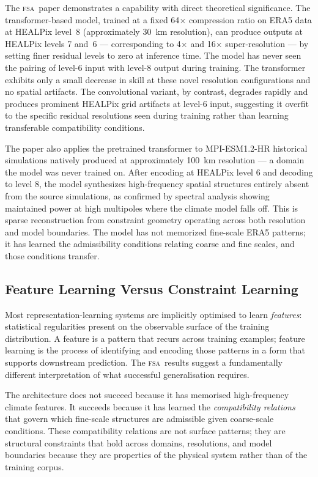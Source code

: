 \documentclass[11pt,a4paper]{article}
\theoremstyle{plain}
\theoremstyle{definition}
\theoremstyle{remark}
\newcommand{\FSA}{\textup{\textsc{fsa}}}
\begin{document}
The \FSA\ paper demonstrates a capability with direct theoretical
significance. The transformer-based model, trained at a fixed 64$\times$
compression ratio on ERA5 data at HEALPix level~8 (approximately 30~km
resolution), can produce outputs at HEALPix levels 7 and~6 --- corresponding
to 4$\times$ and 16$\times$ super-resolution --- by setting finer residual
levels to zero at inference time. The model has never seen the pairing of
level-6 input with level-8 output during training. The transformer exhibits
only a small decrease in skill at these novel resolution configurations and
no spatial artifacts. The convolutional variant, by contrast, degrades
rapidly and produces prominent HEALPix grid artifacts at level-6 input,
suggesting it overfit to the specific residual resolutions seen during
training rather than learning transferable compatibility conditions.

The paper also applies the pretrained transformer to MPI-ESM1.2-HR
historical simulations natively produced at approximately 100~km
resolution --- a domain the model was never trained on. After encoding at
HEALPix level 6 and decoding to level 8, the model synthesizes
high-frequency spatial structures entirely absent from the source simulations,
as confirmed by spectral analysis showing maintained power at high multipoles
where the climate model falls off. This is sparse reconstruction from
constraint geometry operating across both resolution and model boundaries.
The model has not memorized fine-scale ERA5 patterns; it has learned the
admissibility conditions relating coarse and fine scales, and those conditions
transfer.

\subsection{Feature Learning Versus Constraint Learning}

Most representation-learning systems are implicitly optimised to learn
\textit{features}: statistical regularities present on the observable surface
of the training distribution. A feature is a pattern that recurs across
training examples; feature learning is the process of identifying and
encoding those patterns in a form that supports downstream prediction.
The \FSA\ results suggest a fundamentally different interpretation of what
successful generalisation requires.

The architecture does not succeed because it has memorised high-frequency
climate features. It succeeds because it has learned the \textit{compatibility
relations} that govern which fine-scale structures are admissible given
coarse-scale conditions. These compatibility relations are not surface
patterns; they are structural constraints that hold across domains, resolutions,
and model boundaries because they are properties of the physical system
rather than of the training corpus.
\end{document}
